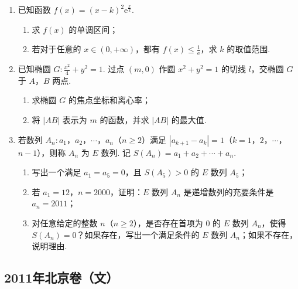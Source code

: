 \begin{description}
\begin{enumerate}[leftmargin=5pt]
（注：方差 \(s^2 = \frac{1}{n}\left[(x_1 - \bar{x})^2 + (x_2 - \bar{x})^2 + \cdots + (x_n - \bar{x})^2\right]\)，其中 \(\bar{x}\) 为 \(x_1\)，\(x_2\)，\(\cdots\)，\(x_n\) 的平均数）

        \item 已知函数 \(f(x) = (x - k)^2{\mathrm{e}}^{\frac{x}{k}}\).

\begin{enumerate}
\item 求 \(f(x)\) 的单调区间；
\item 若对于任意的 \(x \in (0, +\infty)\)，都有 \(f(x) \leqslant \frac{1}{{\mathrm{e}}}\)，求 \(k\) 的取值范围.
\end{enumerate}

        \item 已知椭圆 \(G: \frac{x^2}{4} + y^2 = 1\). 过点 \((m, 0)\) 作圆 \(x^2 + y^2 = 1\) 的切线 \(l\)，交椭圆 \(G\) 于 \(A\)，\(B\) 两点.

\begin{enumerate}
\item 求椭圆 \(G\) 的焦点坐标和离心率；
\item 将 \(\left|AB\right|\) 表示为 \(m\) 的函数，并求 \(\left|AB\right|\) 的最大值.
\end{enumerate}

        \item 若数列 \(A_n : a_1\)，\(a_2\)，\(\cdots\)，\(a_n\)（\(n \geqslant 2\)）满足 \(\left|a_{k+1} - a_k\right| = 1\)（\(k = 1\)，\(2\)，\(\cdots\)，\(n - 1\)），则称 \(A_n\) 为 \(E\) 数列. 记 \(S(A_n) = a_1 + a_2 + \cdots + a_n\).

\begin{enumerate}
\item 写出一个满足 \(a_1 = a_5 = 0\)，且 \(S(A_5) > 0\) 的 \(E\) 数列 \(A_5\)；
\item 若 \(a_1 = 12\)，\(n = 2000\)，证明：\(E\) 数列 \(A_n\) 是递增数列的充要条件是 \(a_n = 2011\)；
\item 对任意给定的整数 \(n\)（\(n \geqslant 2\)），是否存在首项为 \(0\) 的 \(E\) 数列 \(A_n\)，使得 \(S(A_n) = 0\)？如果存在，写出一个满足条件的 \(E\) 数列 \(A_n\)；如果不存在，说明理由.
\end{enumerate}

    \end{enumerate}

\end{description}


\subsection{2011年北京卷（文）}\label{gk:2011年北京卷（文）}

